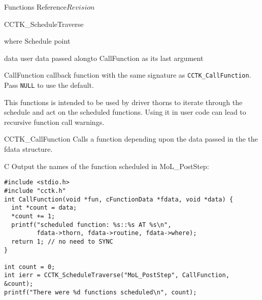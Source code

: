 \begin{cactuspart}{ Functions Reference}{}{$Revision$}
\begin{FunctionDescription}{CCTK\_ScheduleTraverse}
  \begin{ParameterSection}
    \begin{Parameter}{where}
      Schedule point
    \end{Parameter}
    \begin{Parameter}{data}
      user data passed alongto CallFunction as its last argument
    \end{Parameter}
    \begin{Parameter}{CallFunction}
      callback function with the same signature as
        \texttt{CCTK\_CallFunction}. Pass \texttt{NULL} to use the default.
    \end{Parameter}
  \end{ParameterSection}

  \begin{Discussion}
    This functions is intended to be used by driver thorns to iterate through
    the schedule and act on the scheduled functions.  Using it in user code
    can lead to recursive function call warnings.
  \end{Discussion}

  \begin{SeeAlsoSection}
    \begin{SeeAlso}{CCTK\_CallFunction}
      Calls a function depending upon the data passed in the the fdata
      structure.
    \end{SeeAlso}
  \end{SeeAlsoSection}

  \begin{ExampleSection}
    \begin{Example}{C}
      Output the names of the function scheduled in MoL\_PostStep:
\begin{verbatim}
#include <stdio.h>
#include "cctk.h"
int CallFunction(void *fun, cFunctionData *fdata, void *data) {
  int *count = data;
  *count += 1;
  printf("scheduled function: %s::%s AT %s\n",
         fdata->thorn, fdata->routine, fdata->where);
  return 1; // no need to SYNC
}

int count = 0;
int ierr = CCTK_ScheduleTraverse("MoL_PostStep", CallFunction, &count);
printf("There were %d functions scheduled\n", count);
\end{verbatim}
\end{Example}
  \end{ExampleSection}

\end{FunctionDescription}





\end{cactuspart}
